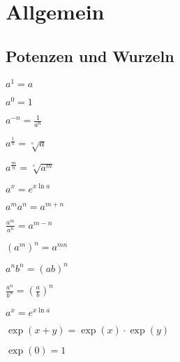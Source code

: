 
\section{Allgemein}

\subsection{Potenzen und Wurzeln}
\begin{compactitem}
    \item 
        \begin{inparaitem}
            \item $a^1 = a$
            \item $a^0 = 1$
        \end{inparaitem}
    \item $a^{-n} = \frac{1}{a^n}$
    \item 
        \begin{inparaitem}
            \item $a^{\frac{1}{n}} = \sqrt[^n]{a}$
            \item $a^{\frac{m}{n}} = \sqrt[^n]{a^m}$
        \end{inparaitem}
    \item $a^x = e^{x \ln a}$
    \item $a^ma^n = a^{m + n}$
    \item $\frac{a^m}{a^n} = a^{m - n}$
    \item $(a^m)^n = a^{m n}$
    \item $a^nb^n = (ab)^n$
    \item $\frac{a^n}{b^n} = \left( \frac{a}{b} \right)^n$
    \item $a^x = e^{x \ln a}$
    \item $\exp(x + y ) = \exp(x) \cdot \exp(y)$
    \item $\exp(0) = 1$
\end{compactitem}

